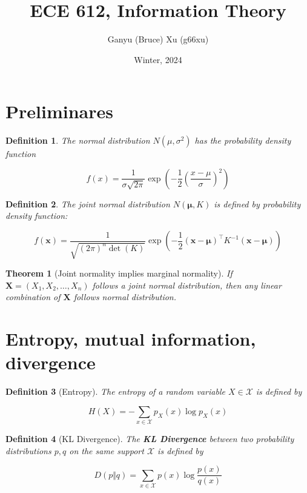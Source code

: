 \documentclass{article}
\title{ECE 612, Information Theory}
\author{Ganyu (Bruce) Xu (g66xu)}
\date{Winter, 2024}
\newtheorem{definition}{Definition}[section]
\newtheorem{theorem}{Theorem}[section]
\begin{document}

\section*{Preliminares}
    \begin{definition}
        The normal distribution $N(\mu, \sigma^2)$ has the probability density function

        $$
        f(x) = \frac{1}{\sigma\sqrt{2\pi}}\exp(-\frac{1}{2}(\frac{x-\mu}{\sigma})^2)
        $$
    \end{definition}

    \begin{definition}
        The joint normal distribution $N(\mathbf{\mu}, K)$ is defined by probability density function:

        $$
        f(\mathbf{x}) = \frac{1}{\sqrt{(2\pi)^n\det(K)}}
        \exp(-\frac{1}{2}
            (\mathbf{x} - \mathbf{\mu})^\intercal
            K^{-1}
            (\mathbf{x} - \mathbf{\mu})
        )
        $$
    \end{definition}

    \begin{theorem}[Joint normality implies marginal normality]
        If $\mathbf{X} = (X_1, X_2, \ldots, X_n)$ follows a joint normal distribution, then any linear combination of $\mathbf{X}$ follows normal distribution.
    \end{theorem}

\section{Entropy, mutual information, divergence}
    \begin{definition}[Entropy]
    The entropy of a random variable $X \in \mathcal{X}$ is defined by

        \begin{equation*}
            H(X) = -\sum_{x \in \mathcal{X}}p_X(x)\log{p_X(x)}
        \end{equation*}
    \end{definition}

    \begin{definition}[KL Divergence]
        The \textbf{KL Divergence} between two probability distributions $p, q$ on the same support $\mathcal{X}$ is defined by

        \begin{equation*}
            D(p \Vert q) = \sum_{x \in \mathcal{X}} p(x) \log{
                \frac{p(x)}{q(x)}
            }
        \end{equation*}
    \end{definition}
\end{document}
